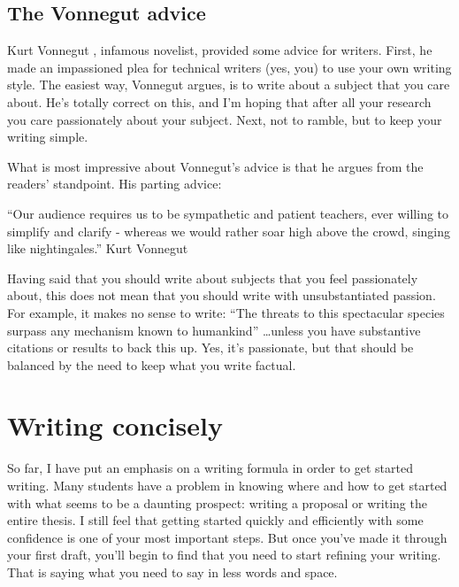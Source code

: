 \documentclass[
]{krantz}
\renewenvironment{quote}{\begin{VF}}{\end{VF}}
\begin{document}
\hypertarget{the-vonnegut-advice}{%
\subsection{The Vonnegut advice}\label{the-vonnegut-advice}}

Kurt Vonnegut \citeyearpar{vonnegut1980how}, infamous novelist, provided some advice for writers. First, he made an impassioned plea for technical writers (yes, you) to use your own writing style. The easiest way, Vonnegut argues, is to write about a subject that you care about. He's totally correct on this, and I'm hoping that after all your research you care passionately about your subject. Next, not to ramble, but to keep your writing simple.

What is most impressive about Vonnegut's advice is that he argues from the readers' standpoint. His parting advice:

\begin{quote}
``Our audience requires us to be sympathetic and patient teachers, ever willing to simplify and clarify - whereas we would rather soar high above the crowd, singing like nightingales.''
Kurt Vonnegut
\end{quote}

Having said that you should write about subjects that you feel passionately about, this does not mean that you should write with unsubstantiated passion. For example, it makes no sense to write: ``The threats to this spectacular species surpass any mechanism known to humankind'' \ldots unless you have substantive citations or results to back this up. Yes, it's passionate, but that should be balanced by the need to keep what you write factual.

\hypertarget{concise}{%
\section{Writing concisely}\label{concise}}

So far, I have put an emphasis on a writing formula in order to get started writing. Many students have a problem in knowing where and how to get started with what seems to be a daunting prospect: writing a proposal or writing the entire thesis. I still feel that getting started quickly and efficiently with some confidence is one of your most important steps. But once you've made it through your first draft, you'll begin to find that you need to start refining your writing. That is saying what you need to say in less words and space.
\end{document}
